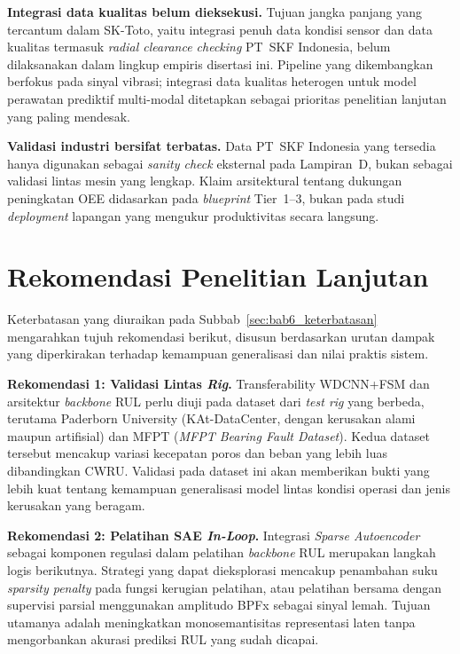 \textbf{Integrasi data kualitas belum dieksekusi.} Tujuan jangka panjang yang
tercantum dalam SK-Toto, yaitu integrasi penuh data kondisi sensor dan data
kualitas termasuk \emph{radial clearance checking} PT~SKF Indonesia, belum
dilaksanakan dalam lingkup empiris disertasi ini. Pipeline yang dikembangkan
berfokus pada sinyal vibrasi; integrasi data kualitas heterogen untuk model
perawatan prediktif multi-modal ditetapkan sebagai prioritas penelitian lanjutan
yang paling mendesak.

\textbf{Validasi industri bersifat terbatas.} Data PT~SKF Indonesia yang
tersedia hanya digunakan sebagai \emph{sanity check} eksternal pada Lampiran~D,
bukan sebagai validasi lintas mesin yang lengkap. Klaim arsitektural tentang
dukungan peningkatan OEE didasarkan pada \emph{blueprint} Tier~1--3, bukan
pada studi \emph{deployment} lapangan yang mengukur produktivitas secara
langsung.

\section{Rekomendasi Penelitian Lanjutan}
\label{sec:bab6_rekomendasi}

Keterbatasan yang diuraikan pada Subbab~\ref{sec:bab6_keterbatasan}
mengarahkan tujuh rekomendasi berikut, disusun berdasarkan urutan dampak
yang diperkirakan terhadap kemampuan generalisasi dan nilai praktis sistem.

\textbf{Rekomendasi 1: Validasi Lintas \emph{Rig}.} Transferability
WDCNN+FSM dan arsitektur \emph{backbone} RUL perlu diuji pada dataset dari
\emph{test rig} yang berbeda, terutama Paderborn University (KAt-DataCenter,
dengan kerusakan alami maupun artifisial) dan MFPT (\emph{MFPT Bearing Fault
Dataset}). Kedua dataset tersebut mencakup variasi kecepatan poros dan beban
yang lebih luas dibandingkan CWRU. Validasi pada dataset ini akan memberikan
bukti yang lebih kuat tentang kemampuan generalisasi model lintas kondisi
operasi dan jenis kerusakan yang beragam.

\textbf{Rekomendasi 2: Pelatihan SAE \emph{In-Loop}.} Integrasi \emph{Sparse
Autoencoder} sebagai komponen regulasi dalam pelatihan \emph{backbone} RUL
merupakan langkah logis berikutnya. Strategi yang dapat dieksplorasi mencakup
penambahan suku \emph{sparsity penalty} pada fungsi kerugian pelatihan, atau
pelatihan bersama dengan supervisi parsial menggunakan amplitudo BPFx sebagai
sinyal lemah. Tujuan utamanya adalah meningkatkan monosemantisitas representasi
laten tanpa mengorbankan akurasi prediksi RUL yang sudah dicapai.


